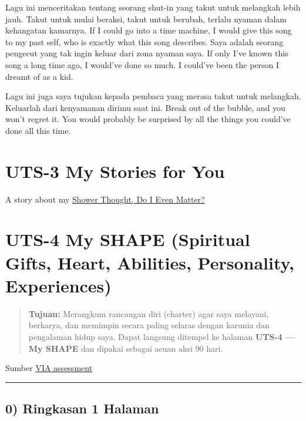 \documentclass[
  letterpaper,
  DIV=11,
  numbers=noendperiod]{scrreprt}
\begin{document}
Lagu ini menceritakan tentang seorang shut-in yang takut untuk melangkah
lebih jauh. Takut untuk mulai beraksi, takut untuk berubah, terlalu
nyaman dalam kehangatan kamarnya. If I could go into a time machine, I
would give this song to my past self, who is exactly what this song
describes. Saya adalah seorang pengecut yang tak ingin keluar dari zona
nyaman saya. If only I've known this song a long time ago, I would've
done so much. I could've been the person I dreamt of as a kid.

Lagu ini juga saya tujukan kepada pembaca yang merasa takut untuk
melangkah. Keluarlah dari kenyamanan dirimu saat ini. Break out of the
bubble, and you won't regret it. You would probably be surprised by all
the things you could've done all this time.


\chapter{UTS-3 My Stories for You}\label{uts-3-my-stories-for-you}

A story about my
\href{https://medium.com/@rafipeen/do-i-even-matter-a-shower-thought-1041949245b0}{Shower
Thought, Do I Even Matter?}


\chapter{UTS-4 My SHAPE (Spiritual Gifts, Heart, Abilities, Personality,
Experiences)}\label{uts-4-my-shape-spiritual-gifts-heart-abilities-personality-experiences}

\begin{quote}
\textbf{Tujuan:} Merangkum rancangan diri (charter) agar saya melayani,
berkarya, dan memimpin secara paling selaras dengan karunia dan
pengalaman hidup saya. Dapat langsung ditempel ke halaman \textbf{UTS-4
--- My SHAPE} dan dipakai sebagai acuan aksi 90 hari.
\end{quote}

Sumber \href{pn.pdf}{VIA assessment}

\begin{center}\rule{0.5\linewidth}{0.5pt}\end{center}

\section{0) Ringkasan 1 Halaman}\label{ringkasan-1-halaman}
\end{document}
